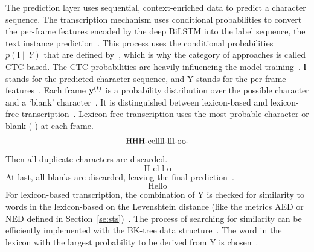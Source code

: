The prediction layer uses sequential, context-enriched data to predict a character sequence.
The transcription mechanism uses conditional probabilities to convert the per-frame features
encoded by the deep \ac{BiLSTM} into the label sequence, the text instance
prediction~\citep{shi_end--end_2017}.
This process uses the conditional probabilities $p(\textbf{l}\|Y)$ that are defined
by~\cite{graves_connectionist_2006}, which is why the category of approaches is called
\ac{CTC}-based.
The \ac{CTC} probabilities are heavily influencing the model
training~\citep{shi_end--end_2017,graves_connectionist_2006}.
$\textbf{l}$ stands for the predicted character sequence, and Y stands for the per-frame
features~\citep{shi_end--end_2017}.
Each frame $\textbf{y}^{(t)}$ is a probability distribution over the possible character and a `blank'
character~\citep{shi_end--end_2017,graves_connectionist_2006}.
It is distinguished between lexicon-based and lexicon-free transcription~\citep{shi_end--end_2017}.
Lexicon-free transcription uses the most probable character or blank (-) at each frame.
\[\text{HHH-eellll-lll-\-oo-\-\-}\]
Then all duplicate characters are discarded.
\[\text{H-el-l-o}\]
At last, all blanks are discarded, leaving the final prediction~\citep{shi_end--end_2017}.
\[\text{Hello}\]
For lexicon-based transcription, the combination of Y is checked for similarity to words in the
lexicon-based on the Levenshtein distance (like the metrics \ac{AED} or \ac{NED} defined in
Section~\ref{se:sts})~\citep{shi_end--end_2017}.
The process of searching for similarity can be efficiently implemented with the BK-tree data
structure~\citep{burkhard_approaches_1973,shi_end--end_2017}.
The word in the lexicon with the largest probability to be derived from Y is
chosen~\citep{shi_end--end_2017}.

